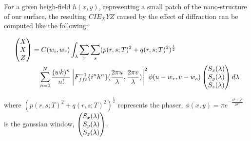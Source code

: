 For a given heigh-field $h(x,y)$, representing a small patch of the nano-structure of our surface, the resulting $CIE_XYZ$ caused by the effect of diffraction can be computed like the following: 

\begin{equation}
\begin{split}
\colvec[X]{X}{Z}& = C(w_i,w_r) \int_{\lambda} \sum_r \sum_s (p(r,s;T)^2 + q(r,s;T)^2)^{\frac{1}{2}} \\
& \quad \sum_{n=0}^N  \frac{(wk)^n}{n!} \left| {F}_{fft}^{-1}\{i^n h^n\}(\frac{2\pi u}{\lambda},\frac{2\pi v}{\lambda})\right|^2 \phi(u-w_r, v-w_s) \colvec[S_x(\lambda)]{S_y(\lambda)}{S_z(\lambda)}d\lambda
\end{split}
\end{equation}

where $(p(r,s;T)^2 + q(r,s;T)^2)^{\frac{1}{2}}$ represents the phaser, $\phi(x,y) = \pi e^{-\frac{x^2 + y^2}{2\sigma_{f}^2}}$ is the gaussian window, $\colvec[S_x(\lambda)]{S_y(\lambda)}{S_z(\lambda)}$.

